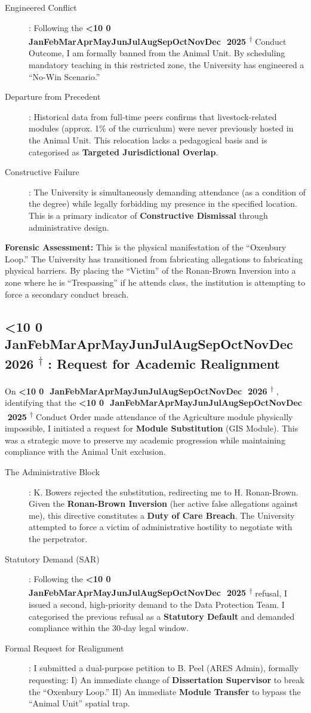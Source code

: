 \documentclass{EMBASSY}
\DeclareRobustCommand{\gmt}[3]{%
    \texorpdfstring{%
        {\color{DateGold}\textbf{%
            \ifnum#1<10 0\fi#1\,\textperiodcentered\,%
            \ifcase#2\or Jan\or Feb\or Mar\or Apr\or May\or Jun\or Jul\or Aug\or Sep\or Oct\or Nov\or Dec\fi
            \,\textperiodcentered\,20#3%
            \textsuperscript{$\dagger$}%
        }}%
    }{%
        (#1/#2/#3)%
    }%
}
\begin{document}
\begin{description}
	\item[Engineered Conflict]: Following the \gmt{8}{12}{25} Conduct Outcome, I am formally banned from the Animal Unit. By scheduling mandatory teaching in this restricted zone, the University has engineered a ``No-Win Scenario.''
	\item[Departure from Precedent]: Historical data from full-time peers confirms that livestock-related modules (approx. 1\% of the curriculum) were never previously hosted in the Animal Unit. This relocation lacks a pedagogical basis and is categorised as \textbf{Targeted Jurisdictional Overlap}.
	\item[Constructive Failure]: The University is simultaneously demanding attendance (as a condition of the degree) while legally forbidding my presence in the specified location. This is a primary indicator of \textbf{Constructive Dismissal} through administrative design.
\end{description}

\noindent\textbf{Forensic Assessment:} This is the physical manifestation of the ``Oxenbury Loop.'' The University has transitioned from fabricating allegations to fabricating physical barriers. By placing the ``Victim'' of the Ronan-Brown Inversion into a zone where he is ``Trespassing'' if he attends class, the institution is attempting to force a secondary conduct breach.

\subsection{\gmt{14}{1}{26}: Request for Academic Realignment}
On \gmt{14}{1}{26}, identifying that the \gmt{8}{12}{25} Conduct Order made attendance of the Agriculture module physically impossible, I initiated a request for \textbf{Module Substitution} (GIS Module). This was a strategic move to preserve my academic progression while maintaining compliance with the Animal Unit exclusion.

\begin{description}
	\item[The Administrative Block]: K. Bowers rejected the substitution, redirecting me to H. Ronan-Brown. Given the \textbf{Ronan-Brown Inversion} (her active false allegations against me), this directive constitutes a \textbf{Duty of Care Breach}. The University attempted to force a victim of administrative hostility to negotiate with the perpetrator.
	\item[Statutory Demand (SAR)]: Following the \gmt{19}{12}{25} refusal, I issued a second, high-priority demand to the Data Protection Team. I categorised the previous refusal as a \textbf{Statutory Default} and demanded compliance within the 30-day legal window.
	\item[Formal Request for Realignment]: I submitted a dual-purpose petition to B. Peel (ARES Admin), formally requesting: \textrm{I)} An immediate change of \textbf{Dissertation Supervisor} to break the ``Oxenbury Loop.'' \textrm{II)} An immediate \textbf{Module Transfer} to bypass the ``Animal Unit'' spatial trap.
\end{description}
\end{document}
